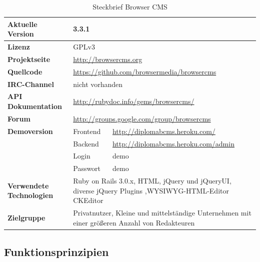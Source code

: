 \begin{table}[!h]
\caption{Steckbrief Browser CMS}
\begin{tabular}[!ht]{|l|l|l|}
\hline
\textbf{Aktuelle Version} & \multicolumn{2}{p{10cm}|}{3.3.1} \\
\hline
\textbf{Lizenz} & \multicolumn{2}{p{10cm}|}{GPLv3} \\
\hline
\textbf{Projektseite} & \multicolumn{2}{p{10cm}|}{\href{http://browsercms.org}{http://browsercms.org}} \\
\hline
\textbf{Quellcode} & \multicolumn{2}{p{10cm}|}{\href{https://github.com/browsermedia/browsercms
}{https://github.com/browsermedia/browsercms}} \\
\hline
\textbf{IRC-Channel} & \multicolumn{2}{p{10cm}|}{nicht vorhanden} \\
\hline
\textbf{API Dokumentation} & \multicolumn{2}{p{10cm}|}{\href{http://rubydoc.info/gems/browsercms/
}{http://rubydoc.info/gems/browsercms/}} \\
\hline
\textbf{Forum} & \multicolumn{2}{p{10cm}|}{\href{http://groups.google.com/group/browsercms}{http://groups.google.com/group/browsercms}} \\
\hline
\textbf{Demoversion} & Frontend & \href{http://diplomabcms.heroku.com/}{http://diplomabcms.heroku.com/} \\
\cline{2-3}
& Backend & \href{http://diplomabcms.heroku.com/cms}{http://diplomabcms.heroku.com/admin} \\
\cline{2-3}
& Login & demo \\
\cline{2-3}
& Passwort & demo \\
\hline
\textbf{Verwendete Technologien} & \multicolumn{2}{p{10cm}|}{Ruby on Rails 3.0.x, HTML, jQuery und jQueryUI, diverse jQuery Plugins ,WYSIWYG-HTML-Editor CKEditor} \\
\hline
\textbf{Zielgruppe} & \multicolumn{2}{p{10cm}|}{Privatnutzer, Kleine und mittelständige Unternehmen mit einer größeren Anzahl von Redakteuren} \\
\hline
\end{tabular}
\end{table}
\subsection{Funktionsprinzipien}

